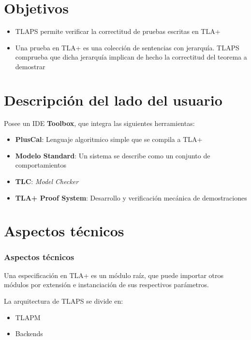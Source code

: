 \documentclass[12pt]{beamer}
\newenvironment{stepitemize}{\begin{itemize}[<+->]}{\end{itemize} }
\begin{document}
\section{Objetivos}
\begin{frame}
\begin{stepitemize}
 \item TLAPS permite verificar la correctitud de pruebas escritas en TLA+
 \item Una prueba en TLA+ es una colección de sentencias con jerarquía. TLAPS comprueba que dicha jerarquía implican de hecho la correctitud del teorema a demostrar
\end{stepitemize}
\end{frame}


\section[Descripción]{Descripción del lado del usuario}
\begin{frame}
    Posee un IDE \textbf{Toolbox}, que integra las siguientes herramientas:
      \begin{stepitemize}
	\item \textbf{PlusCal}: Lenguaje algoritmico simple que se compila a TLA+
	\item \textbf{Modelo Standard}: Un sistema se describe como un conjunto de comportamientos
	\item \textbf{TLC}: \textit{Model Checker}
	\item \textbf{TLA+ Proof System}: Desarrollo y verificación mecánica de demostraciones
      \end{stepitemize}

\end{frame}


\section{Aspectos técnicos}
\begin{frame}
\frametitle{Aspectos técnicos}
  Una especificación en TLA+ es un módulo raíz, que puede importar otros módulos por extensión e instanciación de sus respectivos parámetros.
  \pause
  
  La arquitectura de TLAPS se divide en:
  \begin{itemize}
    \item TLAPM
    \item Backends
  \end{itemize}

\end{frame}
\end{document}

